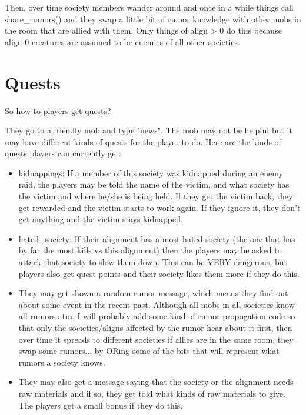 Then, over time society members wander around and once in a while
things call share\_rumors() and they swap a little bit of
rumor knowledge with other mobs in the room that are allied
with them. Only things of align > 0 do this because align 0
creatures are assumed to be enemies of all other societies.

\section{Quests}

So how to players get quests?

They go to a friendly mob and type "news". The mob may not be helpful
but it may have different kinds of quests for the player to do. 
Here are the kinds of quests players can currently get:

\begin{itemize}

\item kidnappings: If a member of this society was kidnapped during an enemy
  raid, the players may be told the name of the victim, and what society
  has the victim and where he/she is being held. If they get the victim back,
  they get rewarded and the victim starts to work again. If they ignore it,
  they don't get anything and the victim stays kidnapped.

\item hated\_society: If their alignment has a most hated society (the one
  that has by far the most kills vs this alignment) then the players
  may be asked to attack that society to slow them down. This can be 
  VERY dangerous, but players also get quest points and their society
  likes them more if they do this.

\item They may get shown a random rumor message, which means they find
  out about some event in the recent past. Although all mobs in all societies
  know all rumors atm, I will probably add some kind of rumor 
  propogation code so that only the societies/aligns affected by
  the rumor hear about it first, then over time it spreads to different
  societies if allies are in the same room, they swap some rumors...
  by ORing some of the bits that will represent what rumors a society 
  knows.

\item They may also get a message saying that the society or the alignment
  needs raw materials and if so, they get told what kinds of raw
  materials to give. The players get a small bonus if they do this.

\end{itemize}

